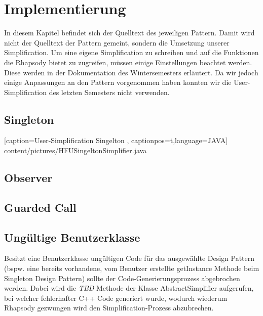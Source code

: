 \chapter{Implementierung}

In diesem Kapitel befindet sich der Quelltext des jeweiligen Pattern. Damit wird
nicht der Quelltext der Pattern gemeint, sondern die Umsetzung unserer
Simplification. Um eine eigene Simplification zu schreiben und auf die
Funktionen die Rhapsody bietet zu zugreifen, müssen einige Einstellungen
beachtet werden. Diese werden in der Dokumentation des Wintersemesters
erläutert. Da wir jedoch einige Anpassungen an den Pattern vorgenommen haben
konnten wir die User-Simplification des letzten Semesters nicht verwenden. 

\section{Singleton}

    [caption={User-Simplification Singelton}
       \label{lst:javaclass},
       captionpos=t,language=JAVA]
 {content/pictures/HFUSingeltonSimplifier.java} 


\section{Observer}


\section{Guarded Call}


\section{Ungültige Benutzerklasse}
Besitzt eine Benutzerklasse ungültigen Code für das ausgewählte Design Pattern (bspw. eine bereits vorhandene, vom Benutzer erstellte getInstance Methode beim Singleton Design Pattern) sollte der Code-Generierungsprozess abgebrochen werden. Dabei wird die \textit{TBD} Methode der Klasse AbstractSimplifier aufgerufen, bei welcher fehlerhafter C++ Code generiert wurde, wodurch wiederum Rhapsody gezwungen wird den Simplification-Prozess abzubrechen.